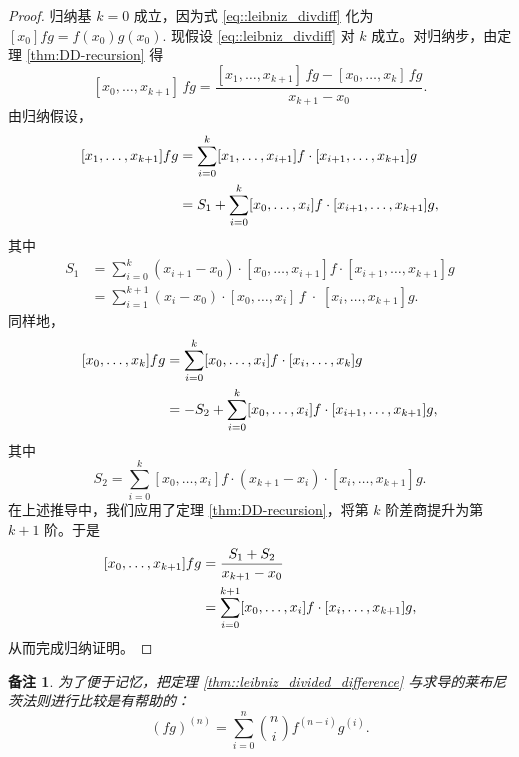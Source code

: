 \documentclass[a4paper]{ctexart}
\newtheorem{remark}{备注}
\numberwithin{theorem}{section}
\numberwithin{equation}{section}
\numberwithin{figure}{section}
\numberwithin{remark}{section}
\begin{document}
\begin{proof}
归纳基 $k=0$ 成立，因为式 \eqref{eq::leibniz_divdiff} 化为 $[x_0]fg=f(x_0)g(x_0)$. 
现假设 \eqref{eq::leibniz_divdiff} 对 $k$ 成立。对归纳步，由定理 \ref{thm:DD-recursion} 得
\[
[x_0,\ldots,x_{k+1}]\,fg=\frac{[x_1,\ldots,x_{k+1}]\,fg-[x_0,\ldots,x_k]\,fg}{x_{k+1}-x_0}.
\]
由归纳假设，
\[
\begin{aligned}
\relax [x_1,\ldots,x_{k+1}] fg &=\sum_{i=0}^{k}[x_1,\ldots,x_{i+1}]f\cdot[x_{i+1},\ldots,x_{k+1}]g \\
&= S_1+\sum_{i=0}^{k}[x_0,\ldots,x_i]f\cdot[x_{i+1},\ldots,x_{k+1}]g,    
\end{aligned}
\]
其中
\[
\begin{aligned}
S_1&=\sum_{i=0}^{k}(x_{i+1}-x_0)\cdot [x_0,\ldots,x_{i+1}]f\cdot[x_{i+1},\ldots,x_{k+1}]g \\
&=\sum_{i=1}^{k+1}(x_i-x_0)\cdot [x_0,\ldots,x_i]\,f\;\cdot\;[x_i,\ldots,x_{k+1}]g.
\end{aligned}
\]
同样地，
\[
\begin{aligned}
\relax [x_0,\ldots,x_k]fg&=\sum_{i=0}^{k}[x_0,\ldots,x_i]f\cdot[x_i,\ldots,x_k]g \\
&= -S_2+\sum_{i=0}^{k}[x_0,\ldots,x_i]f\cdot[x_{i+1},\ldots,x_{k+1}]g,
\end{aligned}
\]
其中
\[
S_2=\sum_{i=0}^{k}[x_0,\ldots,x_i]f\cdot (x_{k+1}-x_i)\cdot [x_i,\ldots,x_{k+1}]g.
\]
在上述推导中，我们应用了定理 \ref{thm:DD-recursion}，将第 $k$ 阶差商提升为第 $k+1$ 阶。于是
\[
\begin{aligned}
\relax [x_0,\ldots,x_{k+1}]fg& =\frac{S_1+S_2}{x_{k+1}-x_0} \\
&=\sum_{i=0}^{k+1}[x_0,\ldots,x_i]f\cdot[x_i,\ldots,x_{k+1}]g,    
\end{aligned}
\]
从而完成归纳证明。
\end{proof}

\begin{remark}
    \label{rem::compare_leibniz_rule}
为了便于记忆，把定理 \ref{thm::leibniz_divided_difference} 与求导的莱布尼茨法则进行比较是有帮助的：
\begin{equation*}
(fg)^{(n)}=\sum_{i=0}^{n}\binom{n}{i} f^{(n-i)}g^{(i)}.
\end{equation*}
\end{remark}
\end{document}
